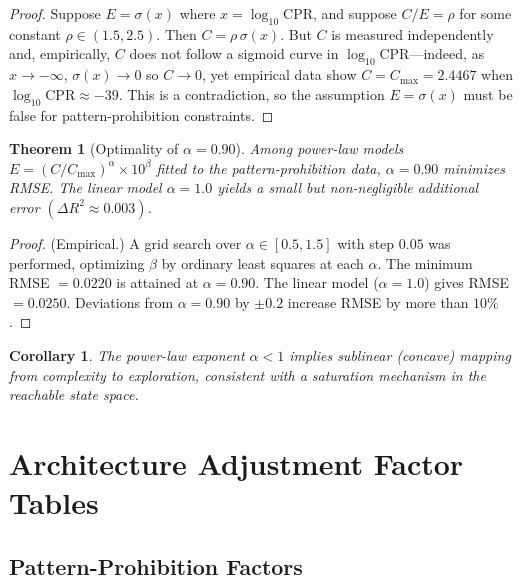 \documentclass[12pt,a4paper]{article}
\newtheorem{theorem}{Theorem}
\newtheorem{corollary}{Corollary}
\begin{document}
\begin{proof}
Suppose $E = \sigma(x)$ where $x = \log_{10}\mathrm{CPR}$, and suppose $C/E = \rho$ for some constant $\rho \in (1.5, 2.5)$. Then $C = \rho\,\sigma(x)$. But $C$ is measured independently and, empirically, $C$ does not follow a sigmoid curve in $\log_{10}\mathrm{CPR}$---indeed, as $x\to -\infty$, $\sigma(x)\to 0$ so $C\to 0$, yet empirical data show $C = C_{\max} = 2.4467$ when $\log_{10}\mathrm{CPR}\approx -39$. This is a contradiction, so the assumption $E = \sigma(x)$ must be false for pattern-prohibition constraints.
\end{proof}

\begin{theorem}[Optimality of $\alpha = 0.90$]\label{thm:alpha}
Among power-law models $E = (C/C_{\max})^{\alpha}\times 10^{\beta}$ fitted to the pattern-prohibition data, $\alpha = 0.90$ minimizes RMSE. The linear model $\alpha = 1.0$ yields a small but non-negligible additional error $(\Delta R^{2} \approx 0.003)$.
\end{theorem}

\begin{proof}
(Empirical.) A grid search over $\alpha \in [0.5, 1.5]$ with step $0.05$ was performed, optimizing $\beta$ by ordinary least squares at each $\alpha$. The minimum RMSE $= 0.0220$ is attained at $\alpha = 0.90$. The linear model ($\alpha=1.0$) gives RMSE $= 0.0250$. Deviations from $\alpha = 0.90$ by $\pm 0.2$ increase RMSE by more than $10\%$.
\end{proof}

\begin{corollary}
The power-law exponent $\alpha < 1$ implies sublinear (concave) mapping from complexity to exploration, consistent with a saturation mechanism in the reachable state space.
\end{corollary}


\section{Architecture Adjustment Factor Tables}\label{app:tables}

\subsection{Pattern-Prohibition Factors}
\end{document}
